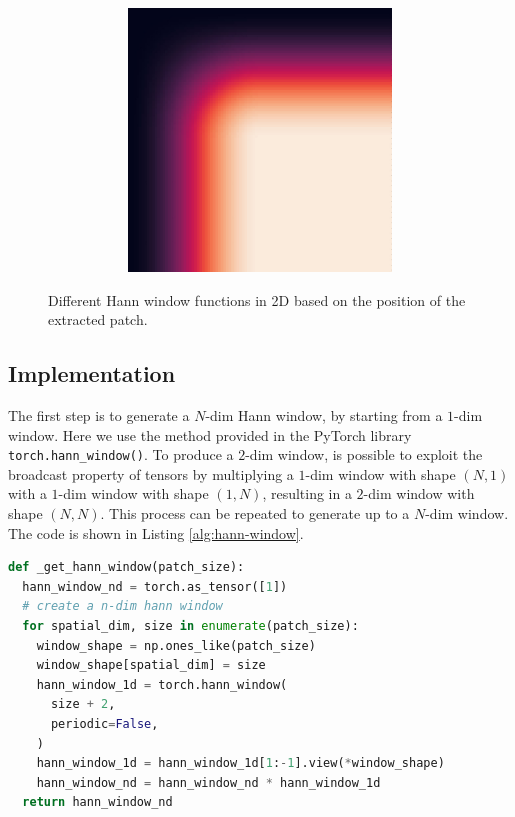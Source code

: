 \begin{figure}
\begin{subfigure}{0.5\textwidth}
\begin{subfigure}{.32\textwidth}
    \end{subfigure}
    \begin{subfigure}{.32\textwidth}
      \centering
      \includegraphics[width=\textwidth]{Images/hann_window_22.jpg}
    \end{subfigure}
  \end{subfigure}
  \caption{Different Hann window functions in 2D based on the position of the extracted patch.}
  \label{fig:hann-window}
\end{figure}

\subsection{Implementation}
The first step is to generate a $N$-dim Hann window, by starting from a $1$-dim
window. Here we use the method provided in the PyTorch library \texttt{torch.hann\_window()}.
To produce a $2$-dim window, is possible to exploit the broadcast property of
tensors by multiplying a $1$-dim window with shape $(N,1)$
with a $1$-dim window with shape $(1,N)$, resulting in a $2$-dim window with
shape $(N,N)$. This process can be repeated to generate up to a $N$-dim window.
The code is shown in Listing \ref{alg:hann-window}. %
\begin{lstlisting}[language=Python, caption=Python code to generate a $N$-dim Hann window, label=alg:hann-window]
def _get_hann_window(patch_size):
  hann_window_nd = torch.as_tensor([1])
  # create a n-dim hann window
  for spatial_dim, size in enumerate(patch_size):
    window_shape = np.ones_like(patch_size)
    window_shape[spatial_dim] = size
    hann_window_1d = torch.hann_window(
      size + 2,
      periodic=False,
    )
    hann_window_1d = hann_window_1d[1:-1].view(*window_shape)
    hann_window_nd = hann_window_nd * hann_window_1d
  return hann_window_nd
\end{lstlisting}

